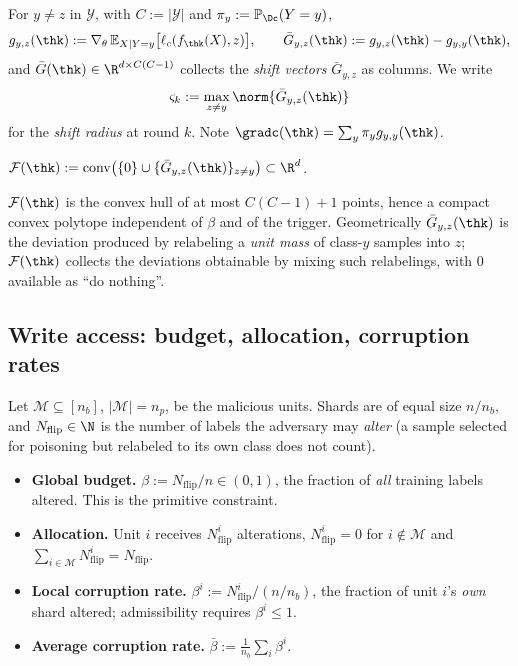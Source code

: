 \begin{definition}
\label{def:shifts}
For $y\neq z$ in $\mathcal Y$, with $C:=|\mathcal{Y}|$ and $\pi_y:=\mathbb{P}_{\Dc}(Y=y)$,
\begin{equation}
g_{y,z}(\thk):=\nabla_\theta\,\mathbb{E}_{X\mid Y=y}\big[\ell_c(f_{\thk}(X),z)\big],
\qquad
\bar G_{y,z}(\thk):=g_{y,z}(\thk)-g_{y,y}(\thk),
\label{eq:shift}
\end{equation}
and $\bar G(\thk)\in\R^{d\times C(C-1)}$ collects the \emph{shift vectors} $\bar G_{y,z}$ as
columns. We write
\begin{equation}
\varsigma_k:=\max_{z\neq y}\norm{\bar G_{y,z}(\thk)}
\label{eq:varsigma}
\end{equation}
for the \emph{shift radius} at round $k$. Note $\gradc(\thk)=\sum_y\pi_yg_{y,y}(\thk)$.
\end{definition}

\begin{definition}
\label{def:Fpoly}
$\mathcal{F}(\thk):=\mathrm{conv}\big(\{0\}\cup\{\bar G_{y,z}(\thk)\}_{z\neq y}\big)\subset\R^d$.
\end{definition}

$\mathcal{F}(\thk)$ is the convex hull of at most $C(C-1)+1$ points, hence a compact convex
polytope independent of $\beta$ and of the trigger. Geometrically $\bar G_{y,z}(\thk)$ is the
deviation produced by relabeling a \emph{unit mass} of class-$y$ samples into $z$;
$\mathcal{F}(\thk)$ collects the deviations obtainable by mixing such relabelings, with $0$
available as ``do nothing''.


\subsection{Write access: budget, allocation, corruption rates}
\label{sec:budget}

\begin{definition}
\label{def:budget}
Let $\mathcal{M}\subseteq[n_b]$, $|\mathcal{M}|=n_p$, be the malicious units. Shards are of equal size $n/n_b$, and $N_{\mathrm{flip}}\in\N$ is the number of labels the adversary may \emph{alter} (a sample selected for poisoning but relabeled to its own class does not count).
\begin{itemize}[noitemsep,leftmargin=*]
\item \textbf{Global budget.} $\beta:=N_{\mathrm{flip}}/n\in(0,1)$, the fraction of \emph{all} training labels altered. This is the primitive constraint.
\item \textbf{Allocation.} Unit $i$ receives $N^i_{\mathrm{flip}}$ alterations, $N^i_{\mathrm{flip}}=0$ for $i\notin\mathcal{M}$ and $\sum_{i\in\mathcal{M}}N^i_{\mathrm{flip}}=N_{\mathrm{flip}}$.
\item \textbf{Local corruption rate.} $\beta^i:=N^i_{\mathrm{flip}}\big/(n/n_b)$, the fraction of unit $i$'s \emph{own} shard altered; admissibility requires $\beta^i\le1$.
\item \textbf{Average corruption rate.} $\bar\beta:=\tfrac1{n_b}\sum_i\beta^i$.
\end{itemize}
\end{definition}

